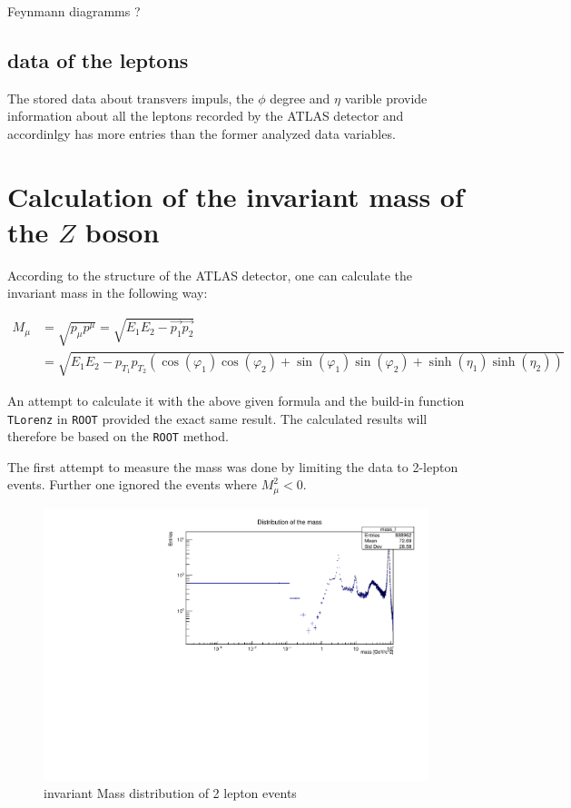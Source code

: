 \documentclass[12pt, a4paper, bibliography=totoc]{scrreprt}
\begin{document}
Feynmann diagramms ?

\subsection{data of the leptons}
The stored data about transvers impuls, the $\phi$ degree and $\eta$ varible provide information about all the leptons recorded by the ATLAS detector and accordinlgy has more entries than the former analyzed data variables.

\section{Calculation of the invariant mass of the $Z$ boson}
According to the structure of the ATLAS detector, one can calculate the invariant mass in the following way:

\begin{align}
	M_{\mu} &= \sqrt{p_{\mu}p^{\mu}} = \sqrt{E_{1}E_{2}-\vec{p_{1}}\vec{p_{2}}}\\
			&= \sqrt{E_{1}E_{2}-p_{T_{1}}p_{T_{2}} (\cos(\varphi_{1})\cos(\varphi_{2})+\sin(\varphi_{1})\sin(\varphi_{2})+\sinh(\eta_{1})\sinh(\eta_{2}))}
\end{align}


An attempt to calculate it with the above given formula and the build-in function \verb*+TLorenz+ in \verb*+ROOT+ provided the exact same result. 
The calculated results will therefore be based on the \verb*+ROOT+ method.


The first attempt to measure the mass was done by limiting the data to 2-lepton events. 
Further one ignored the events where $M_{\mu}^{2} < 0$. 
\begin{figure}[h]
	\centering
	\includegraphics[scale=0.5]{fig/mass_lz_log.pdf}
	\caption{invariant Mass distribution of 2 lepton events}
	\label{mass_lz_log}
\end{figure}
\end{document}
